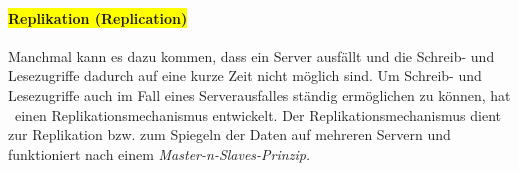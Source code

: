 \paragraph{\colorbox{yellow}{Replikation (Replication)}}\label{replication}
Manchmal kann es dazu kommen, dass ein Server ausfällt und die Schreib- und Lesezugriffe dadurch auf eine kurze Zeit nicht möglich sind. Um Schreib- und Lesezugriffe auch im Fall eines Serverausfalles ständig ermöglichen zu können, hat \mongo\ einen Replikationsmechanismus entwickelt. Der Replikationsmechanismus dient zur Replikation bzw. zum Spiegeln der Daten auf mehreren Servern und funktioniert nach einem \textit{Master-n-Slaves-Prinzip.}
